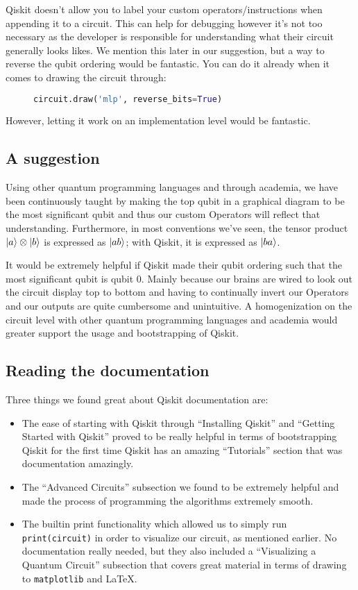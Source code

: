 \documentclass[12pt]{article}
\begin{document}
Qiskit doesn’t allow you to label your custom operators/instructions when appending it to a circuit. This can help for debugging however it’s not too necessary as the developer is responsible for understanding what their circuit generally looks likes. We mention this later in our suggestion, but a way to reverse the qubit ordering would be fantastic. You can do it already when it comes to drawing the circuit through:
\begin{figure}[h]
    \centering
    \begin{lstlisting}[numbers=none, language=Python]
    circuit.draw('mlp', reverse_bits=True)
\end{lstlisting}
\end{figure}

However, letting it work on an implementation level would be fantastic.


\subsection{A suggestion}

Using other quantum programming languages and through academia, we have been continuously taught by making the top qubit in a graphical diagram to be the most significant qubit and thus our custom Operators will reflect that understanding.
Furthermore, in most conventions we've seen, the tensor product $\ket{a} \otimes \ket{b}$ is expressed as $\ket{ab}$; with Qiskit, it is expressed as $\ket{ba}$.

It would be extremely helpful if Qiskit made their qubit ordering such that the most significant qubit is qubit 0. Mainly because our brains are wired to look out the circuit display top to bottom and having to continually invert our Operators and our outputs are quite cumbersome and unintuitive.  
A homogenization on the circuit level with other quantum programming languages and academia would greater support the usage and bootstrapping of Qiskit.

\subsection{Reading the documentation}

Three things we found great about Qiskit documentation are:
\begin{itemize}
    \item The ease of starting with Qiskit through “Installing Qiskit” and “Getting Started with Qiskit” proved to be really helpful in terms of bootstrapping Qiskit for the first time
Qiskit has an amazing “Tutorials” section that was documentation amazingly.
    \item The “Advanced Circuits” subsection we found to be extremely helpful and made the process of programming the algorithms extremely smooth.
    \item The builtin print functionality which allowed us to simply run \texttt{print(circuit)} in order to visualize our circuit, as mentioned earlier.
No documentation really needed, but they also included a “Visualizing a Quantum Circuit” subsection that covers great material in terms of drawing to \texttt{matplotlib} and \LaTeX.
\end{itemize}
\end{document}
